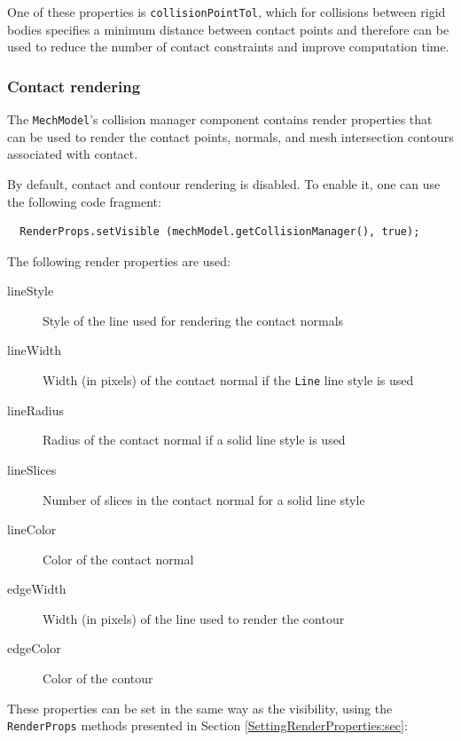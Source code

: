 One of these properties is {\tt collisionPointTol}, which for
collisions between rigid bodies specifies a minimum distance between
contact points and therefore can be used to reduce the number of
contact constraints and improve computation time.

\subsubsection{Contact rendering}

The {\tt MechModel}'s collision manager component contains render
properties that can be used to render the contact points, normals, and
mesh intersection contours associated with contact.

By default, contact and contour rendering is disabled. To enable it,
one can use the following code fragment:
%
\begin{verbatim}
  RenderProps.setVisible (mechModel.getCollisionManager(), true);
\end{verbatim}
%
The following render properties are used:

\begin{description}

\item[lineStyle] \mbox{}
Style of the line used for rendering the contact normals

\item[lineWidth] \mbox{}
Width (in pixels) of the contact normal if the {\tt Line} line style is used

\item[lineRadius] \mbox{}
Radius of the contact normal if a solid line style is used

\item[lineSlices] \mbox{}
Number of slices in the contact normal for a solid line style

\item[lineColor] \mbox{}
Color of the contact normal

\item[edgeWidth] \mbox{}
Width (in pixels) of the line used to render the contour

\item[edgeColor] \mbox{}
Color of the contour

\end{description}

These properties can be set in the same way as the visibility, using
the {\tt RenderProps} methods presented in Section
\ref{SettingRenderProperties:sec}:

